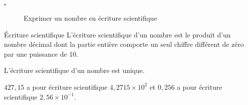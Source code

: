 \begin{titre}

\end{titre}


\begin{CpsCol}
\textbf{}
\begin{description}
\item[$\square$] Exprimer un nombre en écriture scientifique
\end{description}
\end{CpsCol}



\begin{DefT}{Écriture scientifique}
L'écriture scientifique d'un nombre est le produit d'un nombre décimal dont la partie entière comporte un seul chiffre différent de zéro par une puissance de 10.

L'écriture scientifique d'un nombre est unique.
\end{DefT}
 
\begin{Ex}
$427,15$ a pour écriture scientifique $4,2715 \times 10^2$ et $0,256$ a pour écriture scientifique $2,56 \times 10^{-1}$.
\end{Ex}

%
%

